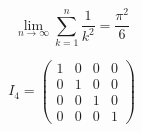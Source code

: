 \documentclass{article}
\begin{document}
\begin{displaymath}
\lim_{n \to \infty}
\sum_{k=1}^n \frac{1}{k^2}
= \frac{\pi^2}{6}
\end{displaymath}

\[
I_4 = 
  \left(
  \begin{array}{cccc}
   1&0&0&0\\
   0&1&0&0\\
   0&0&1&0\\
   0&0&0&1
  \end{array} 
  \right)
\]
\end{document}
